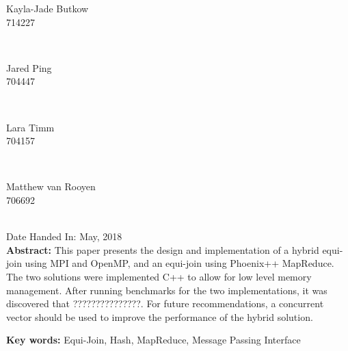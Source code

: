 \documentclass[11pt,twocolumn]{witseiepaper}
\begin{document}
\begin{titlepage}
		
		\begin{minipage}{0.4\textwidth}
			\begin{flushleft} \large
				Kayla-Jade Butkow \\ 714227 %
			\end{flushleft}
		\end{minipage}
		~
		\begin{minipage}{0.4\textwidth}
			\begin{flushright} \large
				Jared Ping \\ 704447
			\end{flushright}
		\end{minipage}\\[0.8cm]
		
		\begin{minipage}{0.4\textwidth}
			\begin{flushleft} \large
				Lara Timm \\ 704157
			\end{flushleft}
		\end{minipage}
		~
		\begin{minipage}{0.4\textwidth}
			\begin{flushright} \large
				Matthew van Rooyen \\ 706692
			\end{flushright}
		\end{minipage}\\[0.8cm]
		{\large Date Handed In:  May, 2018}\\[1cm] 
\vfill	
\justify
\textbf{Abstract:} This paper presents the design and implementation of a hybrid equi-join using MPI and OpenMP, and an equi-join using Phoenix++ MapReduce. The two solutions were implemented C++ to allow for low level memory management. After running benchmarks for the two implementations, it was discovered that ???????????????. For future recommendations, a concurrent vector should be used to improve the performance of the hybrid solution.

\textbf{Key words:} Equi-Join, Hash, MapReduce, Message Passing Interface 
		
	\end{titlepage}

\pagestyle{plain}
\setcounter{page}{1}
\twocolumn
\end{document}
